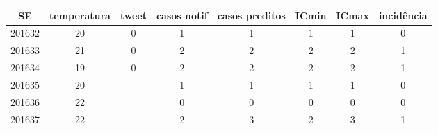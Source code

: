 \begin{tabular}{c|ccccccc}
  \hline
SE & temperatura & tweet & casos notif & casos preditos & ICmin & ICmax & incidência \\ 
  \hline
201632 & 20 & 0 & 1 & 1 & 1 & 1 & 0 \\ 
  201633 & 21 & 0 & 2 & 2 & 2 & 2 & 1 \\ 
  201634 & 19 & 0 & 2 & 2 & 2 & 2 & 1 \\ 
  201635 & 20 &  & 1 & 1 & 1 & 1 & 0 \\ 
  201636 & 22 &  & 0 & 0 & 0 & 0 & 0 \\ 
  201637 & 22 &  & 2 & 3 & 2 & 3 & 1 \\ 
   \hline
\end{tabular}
